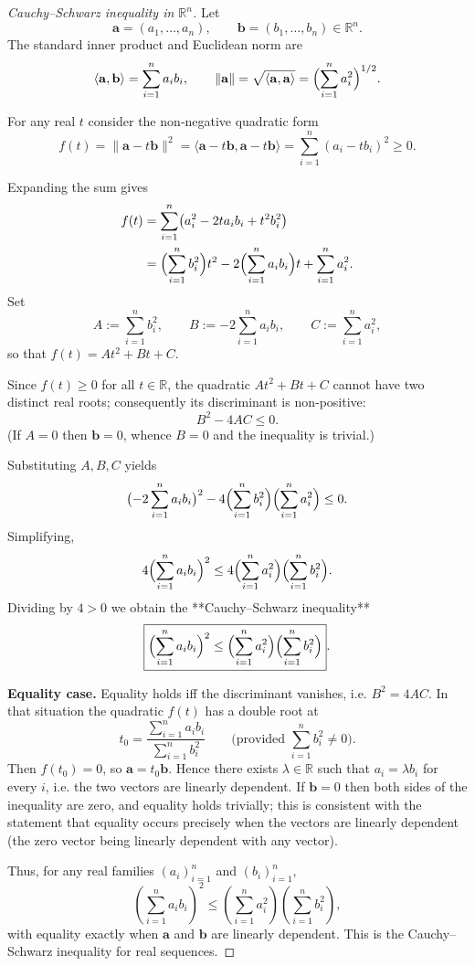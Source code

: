 \begin{proof}[Cauchy–Schwarz inequality in $\mathbb{R}^{n}$]
Let  
\[
\mathbf a=(a_{1},\dots ,a_{n}),\qquad 
\mathbf b=(b_{1},\dots ,b_{n})\in\mathbb R^{n}.
\]
The standard inner product and Euclidean norm are  
\[
\langle\mathbf a,\mathbf b\rangle=\sum_{i=1}^{n}a_i b_i ,\qquad
\|\mathbf a\|=\sqrt{\langle\mathbf a,\mathbf a\rangle}
        =\Bigl(\sum_{i=1}^{n}a_i^{2}\Bigr)^{1/2}.
\]

For any real $t$ consider the non‑negative quadratic form  
\[
f(t)=\|\mathbf a-t\mathbf b\|^{2}
    =\langle\mathbf a-t\mathbf b,\mathbf a-t\mathbf b\rangle
    =\sum_{i=1}^{n}(a_i-t b_i)^{2}\ge 0 .
\]

Expanding the sum gives  
\[
\begin{aligned}
f(t)
   &=\sum_{i=1}^{n}\bigl(a_i^{2}-2t a_i b_i+t^{2}b_i^{2}\bigr)\\
   &=\Bigl(\sum_{i=1}^{n}b_i^{2}\Bigr)t^{2}
     -2\Bigl(\sum_{i=1}^{n}a_i b_i\Bigr)t
     +\sum_{i=1}^{n}a_i^{2}.
\end{aligned}
\]
Set  
\[
A:=\sum_{i=1}^{n}b_i^{2},\qquad
B:=-2\sum_{i=1}^{n}a_i b_i,\qquad
C:=\sum_{i=1}^{n}a_i^{2},
\]
so that $f(t)=At^{2}+Bt+C$.

Since $f(t)\ge0$ for all $t\in\mathbb R$, the quadratic $At^{2}+Bt+C$ cannot have two distinct real roots; consequently its discriminant is non‑positive:
\[
B^{2}-4AC\le 0 .
\]
(If $A=0$ then $\mathbf b=0$, whence $B=0$ and the inequality is trivial.)

Substituting $A,B,C$ yields
\[
\bigl(-2\sum_{i=1}^{n}a_i b_i\bigr)^{2}
   -4\Bigl(\sum_{i=1}^{n}b_i^{2}\Bigr)\Bigl(\sum_{i=1}^{n}a_i^{2}\Bigr)\le0 .
\]
Simplifying,
\[
4\Bigl(\sum_{i=1}^{n}a_i b_i\Bigr)^{2}
   \le 4\Bigl(\sum_{i=1}^{n}a_i^{2}\Bigr)\Bigl(\sum_{i=1}^{n}b_i^{2}\Bigr).
\]
Dividing by $4>0$ we obtain the **Cauchy–Schwarz inequality**
\[
\boxed{\Bigl(\sum_{i=1}^{n}a_i b_i\Bigr)^{2}
       \le\Bigl(\sum_{i=1}^{n}a_i^{2}\Bigr)
          \Bigl(\sum_{i=1}^{n}b_i^{2}\Bigr)} .
\]

\textbf{Equality case.}  
Equality holds iff the discriminant vanishes, i.e. $B^{2}=4AC$.  
In that situation the quadratic $f(t)$ has a double root at
\[
t_{0}= \frac{\sum_{i=1}^{n}a_i b_i}{\sum_{i=1}^{n}b_i^{2}}
      \qquad\bigl(\text{provided }\sum_{i=1}^{n}b_i^{2}\neq0\bigr).
\]
Then $f(t_{0})=0$, so $\mathbf a=t_{0}\mathbf b$. Hence there exists
$\lambda\in\mathbb R$ such that $a_i=\lambda b_i$ for every $i$, i.e.
the two vectors are linearly dependent.  
If $\mathbf b=0$ then both sides of the inequality are zero, and equality
holds trivially; this is consistent with the statement that equality occurs
precisely when the vectors are linearly dependent (the zero vector being
linearly dependent with any vector).

Thus, for any real families $(a_i)_{i=1}^{n}$ and $(b_i)_{i=1}^{n}$,
\[
\left(\sum_{i=1}^{n}a_i b_i\right)^{2}
   \le
\left(\sum_{i=1}^{n}a_i^{2}\right)
\left(\sum_{i=1}^{n}b_i^{2}\right),
\]
with equality exactly when $\mathbf a$ and $\mathbf b$ are linearly
dependent. This is the Cauchy–Schwarz inequality for real sequences.
\end{proof}